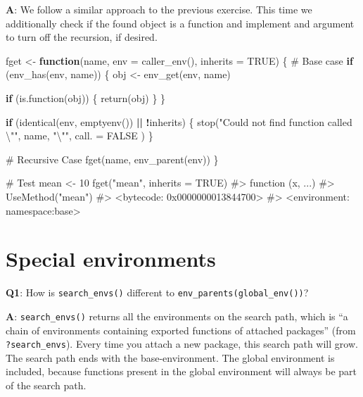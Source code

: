 \documentclass[
]{krantz}
\makeatletter
\newenvironment{Shaded}{\begin{snugshade}}{\end{snugshade}}
\newcommand{\CharTok}[1]{\textcolor[rgb]{0.31,0.60,0.02}{#1}}
\newcommand{\CommentTok}[1]{\textcolor[rgb]{0.56,0.35,0.01}{\textit{#1}}}
\newcommand{\ControlFlowTok}[1]{\textcolor[rgb]{0.13,0.29,0.53}{\textbf{#1}}}
\newcommand{\DataTypeTok}[1]{\textcolor[rgb]{0.13,0.29,0.53}{#1}}
\newcommand{\DecValTok}[1]{\textcolor[rgb]{0.00,0.00,0.81}{#1}}
\newcommand{\KeywordTok}[1]{\textcolor[rgb]{0.13,0.29,0.53}{\textbf{#1}}}
\newcommand{\NormalTok}[1]{#1}
\newcommand{\OperatorTok}[1]{\textcolor[rgb]{0.81,0.36,0.00}{\textbf{#1}}}
\newcommand{\OtherTok}[1]{\textcolor[rgb]{0.56,0.35,0.01}{#1}}
\newcommand{\StringTok}[1]{\textcolor[rgb]{0.31,0.60,0.02}{#1}}
\newenvironment{kframe}{%
\medskip{}
\setlength{\fboxsep}{.8em}
 \def\at@end@of@kframe{}%
 \ifinner\ifhmode%
  \def\at@end@of@kframe{\end{minipage}}%
  \begin{minipage}{\columnwidth}%
 \fi\fi%
 \def\FrameCommand##1{\hskip\@totalleftmargin \hskip-\fboxsep
 \colorbox{shadecolor}{##1}\hskip-\fboxsep
     \hskip-\linewidth \hskip-\@totalleftmargin \hskip\columnwidth}%
 \MakeFramed {\advance\hsize-\width
   \@totalleftmargin\z@ \linewidth\hsize
   \@setminipage}}%
 {\par\unskip\endMakeFramed%
 \at@end@of@kframe}
\renewenvironment{Shaded}{\begin{kframe}}{\end{kframe}}
\renewcommand{\KeywordTok} [1]{\textcolor[rgb]{0.00,0.44,0.13}{{#1}}}
\renewcommand{\DataTypeTok}[1]{\textcolor[rgb]{0.56,0.13,0.00}{{#1}}}
\renewcommand{\DecValTok}  [1]{\textcolor[rgb]{0.25,0.63,0.44}{{#1}}}
\renewcommand{\CharTok}    [1]{\textcolor[rgb]{0.25,0.44,0.63}{{#1}}}
\renewcommand{\StringTok}  [1]{\textcolor[rgb]{0.25,0.44,0.63}{{#1}}}
\renewcommand{\CommentTok} [1]{\textcolor[rgb]{0.38,0.63,0.69}{{#1}}}
\renewcommand{\OtherTok}   [1]{\textcolor[rgb]{0.00,0.44,0.13}{{#1}}}
\renewcommand{\NormalTok}  [1]{{#1}}
\makeatother
\begin{document}
\textbf{{A}}: We follow a similar approach to the previous exercise. This time we additionally check if the found object is a function and implement and argument to turn off the recursion, if desired.

\begin{Shaded}
\begin{Highlighting}[]
\NormalTok{fget <-}\StringTok{ }\ControlFlowTok{function}\NormalTok{(name, }\DataTypeTok{env =} \KeywordTok{caller_env}\NormalTok{(), }\DataTypeTok{inherits =} \OtherTok{TRUE}\NormalTok{) \{}
  \CommentTok{# Base case}
  \ControlFlowTok{if}\NormalTok{ (}\KeywordTok{env_has}\NormalTok{(env, name)) \{}
\NormalTok{    obj <-}\StringTok{ }\KeywordTok{env_get}\NormalTok{(env, name)}

    \ControlFlowTok{if}\NormalTok{ (}\KeywordTok{is.function}\NormalTok{(obj)) \{}
      \KeywordTok{return}\NormalTok{(obj)}
\NormalTok{    \}}
\NormalTok{  \}}

  \ControlFlowTok{if}\NormalTok{ (}\KeywordTok{identical}\NormalTok{(env, }\KeywordTok{emptyenv}\NormalTok{()) }\OperatorTok{||}\StringTok{ }\OperatorTok{!}\NormalTok{inherits) \{}
    \KeywordTok{stop}\NormalTok{(}\StringTok{"Could not find function called }\CharTok{\textbackslash{}"}\StringTok{"}\NormalTok{, name, }\StringTok{"}\CharTok{\textbackslash{}"}\StringTok{"}\NormalTok{,}
      \DataTypeTok{call. =} \OtherTok{FALSE}
\NormalTok{    )}
\NormalTok{  \}}

  \CommentTok{# Recursive Case}
  \KeywordTok{fget}\NormalTok{(name, }\KeywordTok{env_parent}\NormalTok{(env))}
\NormalTok{\}}

\CommentTok{# Test}
\NormalTok{mean <-}\StringTok{ }\DecValTok{10}
\KeywordTok{fget}\NormalTok{(}\StringTok{"mean"}\NormalTok{, }\DataTypeTok{inherits =} \OtherTok{TRUE}\NormalTok{)}
\CommentTok{#> function (x, ...) }
\CommentTok{#> UseMethod("mean")}
\CommentTok{#> <bytecode: 0x0000000013844700>}
\CommentTok{#> <environment: namespace:base>}
\end{Highlighting}
\end{Shaded}

\hypertarget{special-environments}{%
\section{Special environments}\label{special-environments}}

\textbf{{Q1}}: How is \texttt{search\_envs()} different to \texttt{env\_parents(global\_env())}?

\textbf{{A}}: \texttt{search\_envs()} returns all the environments on the search path, which is ``a chain of environments containing exported functions of attached packages'' (from \texttt{?search\_envs}). Every time you attach a new package, this search path will grow. The search path ends with the base-environment. The global environment is included, because functions present in the global environment will always be part of the search path.
\end{document}
